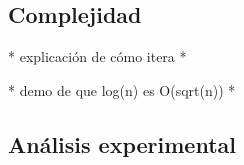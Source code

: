 
\subsection{Complejidad}
	* explicación de cómo itera *

	* demo de que log(n) es O(sqrt(n)) *

\subsection{Análisis experimental}
